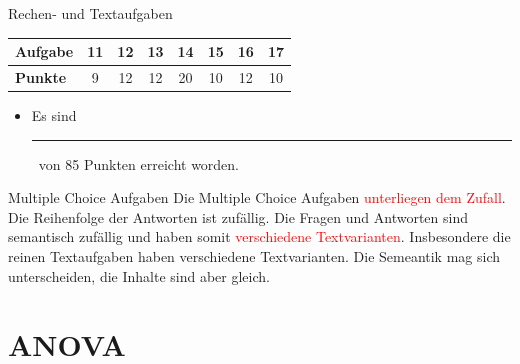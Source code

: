 \documentclass[a4paper, 9pt]{scrartcl}\usepackage[]{graphicx}\usepackage[]{xcolor}
\begin{document}
\begin{graybox}{Rechen- und Textaufgaben}
  \begin{center}
    \large
    \begin{tabular}{|l|c|c|c|c|c|c|c|}
      \hline
      \textbf{Aufgabe} & \textbf{11} & \textbf{12} & \textbf{13} & \textbf{14} & \textbf{15} & \textbf{16} & \textbf{17} \strut\\
      \hline
      \textbf{Punkte} & 
      \hspace{1Ex}\Large\textcolor{gray!70}{9}\hspace{1Ex}  & 
      \hspace{1Ex}\Large\textcolor{gray!70}{12}\hspace{1Ex}  & 
      \hspace{1Ex}\Large\textcolor{gray!70}{12}\hspace{1Ex}  & 
      \hspace{1Ex}\Large\textcolor{gray!70}{20}\hspace{1Ex}  & 
      \hspace{1Ex}\Large\textcolor{gray!70}{10}\hspace{1Ex}  & 
      \hspace{1Ex}\Large\textcolor{gray!70}{12}\hspace{1Ex}  & 
      \hspace{1Ex}\Large\textcolor{gray!70}{10}\hspace{1Ex} \strut\\
      \hline
  \end{tabular}
\end{center}
\begin{itemize}
\item Es sind \rule[0ex]{2em}{.4pt}\, von 85 Punkten erreicht worden.
\end{itemize}
\end{graybox}

\clearpage
\begin{graybox}{Multiple Choice Aufgaben}
Die Multiple Choice Aufgaben \textcolor{red}{unterliegen dem Zufall}. Die Reihenfolge der Antworten ist zufällig. Die Fragen und Antworten sind semantisch zufällig und haben somit \textcolor{red}{verschiedene Textvarianten}. Insbesondere die reinen Textaufgaben haben verschiedene Textvarianten. Die Semeantik mag sich unterscheiden, die Inhalte sind aber gleich.
\end{graybox}
\section*{ANOVA}
\end{document}
